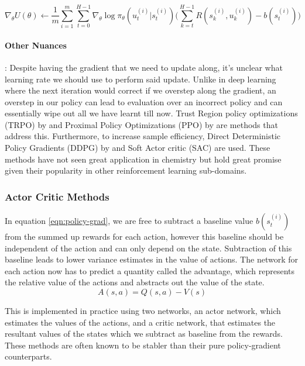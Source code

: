 \begin{equation}\label{eqn:policy-grad}
    \nabla_\theta U(\theta) \leftarrow \frac{1}{m} \sum_{i=1}^{m} \sum_{t=0}^{H-1} \nabla_\theta \log \pi_\theta (u_t^{(i)}|s_t^{(i)}) \Bigg(\sum_{k=t}^{H-1} R(s_k^{(i)}, u_k^{(i)}) - b(s_t^{(i)})\Bigg)
\end{equation}

\paragraph{Other Nuances}: Despite having the gradient that we need to update along, it's unclear what learning rate we should use to perform said update. Unlike in deep learning where the next iteration would correct if we overstep along the gradient, an overstep in our policy can lead to evaluation over an incorrect policy and can essentially wipe out all we have learnt till now. Trust Region policy optimizations (TRPO) by \cite{trpo} and Proximal Policy Optimizations (PPO) by \cite{ppo} are methods that address this. Furthermore, to increase sample efficiency, Direct Deterministic Policy Gradients (DDPG) by \cite{ddpg} and Soft Actor critic (SAC) \cite{sac} are used. These methods have not seen great application in chemistry but hold great promise given their popularity in other reinforcement learning sub-domains.

\subsubsection{Actor Critic Methods}

In equation \ref{eqn:policy-grad}, we are free to subtract a baseline value $b(s_t^{(i)})$ from the summed up rewards for each action, however this baseline should be independent of the action and can only depend on the state. Subtraction of this baseline leads to lower variance estimates in the value of actions. The network for each action now has to predict a quantity called the advantage, which represents the relative value of the actions and abstracts out the value of the state.
\begin{equation}\label{eqn:advantage}
    A(s, a) = Q(s, a) - V(s)
\end{equation}

This is implemented in practice using two networks, an actor network, which estimates the values of the actions, and a critic network, that estimates the resultant values of the states which we subtract as baseline from the rewards. These methods are often known to be stabler than their pure policy-gradient counterparts.

